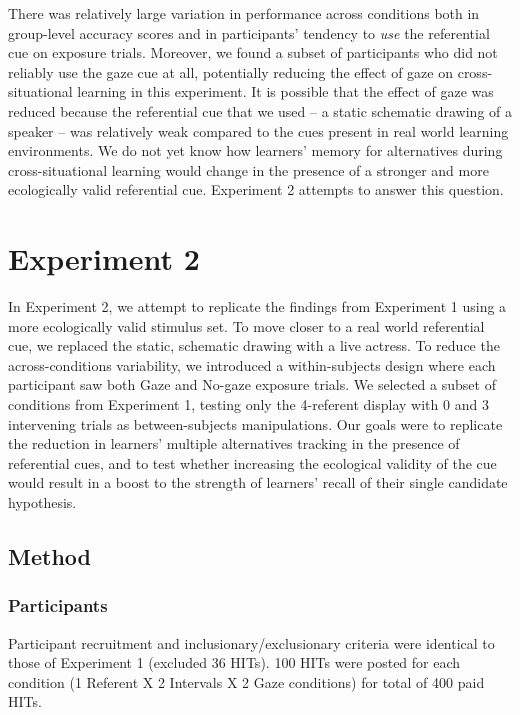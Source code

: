 \documentclass[a4paper,man,floatsintext]{apa6}
\begin{document}
There was relatively large variation in performance across conditions
both in group-level accuracy scores and in participants' tendency to
\emph{use} the referential cue on exposure trials. Moreover, we found a
subset of participants who did not reliably use the gaze cue at all,
potentially reducing the effect of gaze on cross-situational learning in
this experiment. It is possible that the effect of gaze was reduced
because the referential cue that we used -- a static schematic drawing
of a speaker -- was relatively weak compared to the cues present in real
world learning environments. We do not yet know how learners' memory for
alternatives during cross-situational learning would change in the
presence of a stronger and more ecologically valid referential cue.
Experiment 2 attempts to answer this question.

\section{Experiment 2}\label{experiment-2}

In Experiment 2, we attempt to replicate the findings from Experiment 1
using a more ecologically valid stimulus set. To move closer to a real
world referential cue, we replaced the static, schematic drawing with a
live actress. To reduce the across-conditions variability, we introduced
a within-subjects design where each participant saw both Gaze and
No-gaze exposure trials. We selected a subset of conditions from
Experiment 1, testing only the 4-referent display with 0 and 3
intervening trials as between-subjects manipulations. Our goals were to
replicate the reduction in learners' multiple alternatives tracking in
the presence of referential cues, and to test whether increasing the
ecological validity of the cue would result in a boost to the strength
of learners' recall of their single candidate hypothesis.

\subsection{Method}\label{method-1}

\subsubsection{Participants}\label{participants-1}

Participant recruitment and inclusionary/exclusionary criteria were
identical to those of Experiment 1 (excluded 36 HITs). 100 HITs were
posted for each condition (1 Referent X 2 Intervals X 2 Gaze conditions)
for total of 400 paid HITs.
\end{document}

